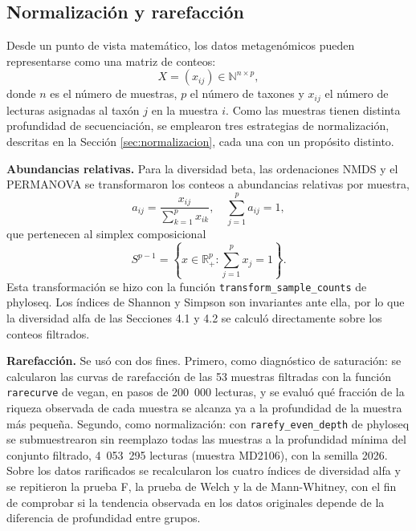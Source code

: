 \subsection{Normalización y rarefacción}
\label{sec:met-normalizacion}

Desde un punto de vista matemático, los datos metagenómicos pueden representarse como una matriz
de conteos:
\begin{equation}
X = (x_{ij}) \in \mathbb{N}^{n \times p},
\label{eq:matriz-conteos-cap3}
\end{equation}
donde $n$ es el número de muestras, $p$ el número de taxones y $x_{ij}$ el número de lecturas
asignadas al taxón $j$ en la muestra $i$. Como las muestras tienen distinta profundidad de
secuenciación, se emplearon tres estrategias de normalización, descritas en la Sección
\ref{sec:normalizacion}, cada una con un propósito distinto.

\textbf{Abundancias relativas.} Para la diversidad beta, las ordenaciones NMDS y el PERMANOVA se
transformaron los conteos a abundancias relativas por muestra,
\begin{equation}
a_{ij} = \frac{x_{ij}}{\sum_{k=1}^{p} x_{ik}},
\quad
\sum_{j=1}^{p} a_{ij} = 1,
\label{eq:abundancia-relativa}
\end{equation}
que pertenecen al simplex composicional
\begin{equation}
S^{p-1} = \left\{ x \in \mathbb{R}_+^p : \sum_{j=1}^{p} x_j = 1 \right\}.
\label{eq:simplex}
\end{equation}
Esta transformación se hizo con la función \texttt{transform\_sample\_counts} de phyloseq. Los
índices de Shannon y Simpson son invariantes ante ella, por lo que la diversidad alfa de las
Secciones 4.1 y 4.2 se calculó directamente sobre los conteos filtrados.

\textbf{Rarefacción.} Se usó con dos fines. Primero, como diagnóstico de saturación: se calcularon
las curvas de rarefacción de las 53 muestras filtradas con la función \texttt{rarecurve} de vegan,
en pasos de 200~000 lecturas, y se evaluó qué fracción de la riqueza observada de cada muestra se
alcanza ya a la profundidad de la muestra más pequeña. Segundo, como normalización: con
\texttt{rarefy\_even\_depth} de phyloseq se submuestrearon sin reemplazo todas las muestras a la
profundidad mínima del conjunto filtrado, 4~053~295 lecturas (muestra MD2106), con la semilla 2026.
Sobre los datos rarificados se recalcularon los cuatro índices de diversidad alfa y se repitieron la
prueba F, la prueba de Welch y la de Mann-Whitney, con el fin de comprobar si la tendencia observada
en los datos originales depende de la diferencia de profundidad entre grupos.

